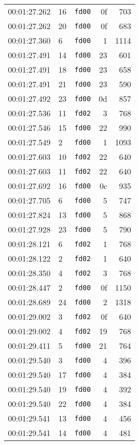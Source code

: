 \documentclass{article}
\begin{document}
\begin{longtable}{lllrr}
00:01:27.262 & 16 & \texttt{fd00} & 0f & 703 \\
00:01:27.262 & 20 & \texttt{fd00} & 0f & 683 \\
00:01:27.360 & 6 & \texttt{fd00} & 1 & 1114 \\
00:01:27.491 & 14 & \texttt{fd00} & 23 & 601 \\
00:01:27.491 & 18 & \texttt{fd00} & 23 & 658 \\
00:01:27.491 & 21 & \texttt{fd00} & 23 & 590 \\
00:01:27.492 & 23 & \texttt{fd00} & 0d & 857 \\
00:01:27.536 & 11 & \texttt{fd02} & 3 & 768 \\
00:01:27.546 & 15 & \texttt{fd00} & 22 & 990 \\
00:01:27.549 & 2 & \texttt{fd00} & 1 & 1093 \\
00:01:27.603 & 10 & \texttt{fd02} & 22 & 640 \\
00:01:27.603 & 11 & \texttt{fd02} & 22 & 640 \\
00:01:27.692 & 16 & \texttt{fd00} & 0c & 935 \\
00:01:27.705 & 6 & \texttt{fd00} & 5 & 747 \\
00:01:27.824 & 13 & \texttt{fd00} & 5 & 868 \\
00:01:27.928 & 23 & \texttt{fd00} & 5 & 790 \\
00:01:28.121 & 6 & \texttt{fd02} & 1 & 768 \\
00:01:28.122 & 2 & \texttt{fd02} & 1 & 640 \\
00:01:28.350 & 4 & \texttt{fd02} & 3 & 768 \\
00:01:28.447 & 2 & \texttt{fd00} & 0f & 1150 \\
00:01:28.689 & 24 & \texttt{fd00} & 2 & 1318 \\
00:01:29.002 & 3 & \texttt{fd02} & 0f & 640 \\
00:01:29.002 & 4 & \texttt{fd02} & 19 & 768 \\
00:01:29.411 & 5 & \texttt{fd00} & 21 & 764 \\
00:01:29.540 & 3 & \texttt{fd00} & 4 & 396 \\
00:01:29.540 & 17 & \texttt{fd00} & 4 & 384 \\
00:01:29.540 & 19 & \texttt{fd00} & 4 & 392 \\
00:01:29.540 & 22 & \texttt{fd00} & 4 & 384 \\
00:01:29.541 & 13 & \texttt{fd00} & 4 & 456 \\
00:01:29.541 & 14 & \texttt{fd00} & 4 & 481 \\

\end{longtable}
\end{document}
